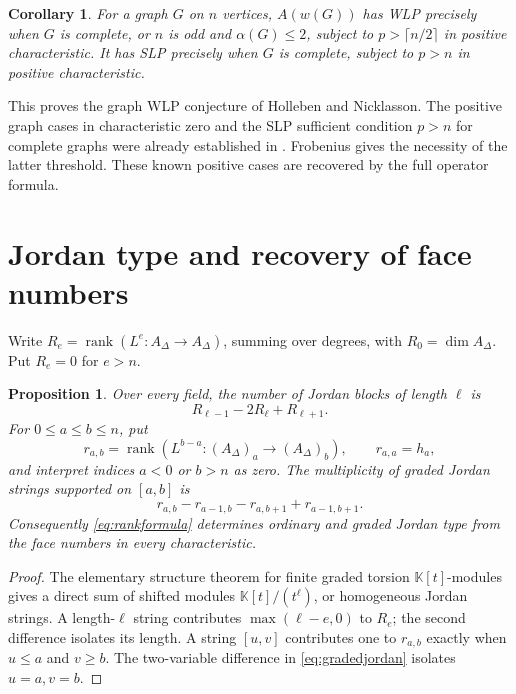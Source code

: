 \documentclass[11pt]{article}
\newtheorem{proposition}[theorem]{Proposition}
\newtheorem{corollary}[theorem]{Corollary}
\theoremstyle{remark}
\newcommand{\kk}{\mathbb K}
\newcommand{\rk}{\operatorname{rank}}
\begin{document}
\begin{corollary}\label{cor:graph}
For a graph $G$ on $n$ vertices, $A(w(G))$ has WLP precisely when $G$ is complete, or $n$ is odd and $\alpha(G)\leq2$, subject to $p>\lceil n/2\rceil$ in positive characteristic. It has SLP precisely when $G$ is complete, subject to $p>n$ in positive characteristic.
\end{corollary}
This proves the graph WLP conjecture of Holleben and Nicklasson. The positive graph cases in characteristic zero and the SLP sufficient condition $p>n$ for complete graphs were already established in \cite{HN}. Frobenius gives the necessity of the latter threshold. These known positive cases are recovered by the full operator formula.

\section{Jordan type and recovery of face numbers}
Write $R_e=\rk(L^e:A_\Delta\to A_\Delta)$, summing over degrees, with $R_0=\dim A_\Delta$. Put $R_e=0$ for $e>n$.
\begin{proposition}\label{prop:jordan}
Over every field, the number of Jordan blocks of length $\ell$ is
\[
 R_{\ell-1}-2R_\ell+R_{\ell+1}.
\]
For $0\leq a\leq b\leq n$, put
\[
 r_{a,b}=\rk(L^{b-a}:(A_\Delta)_a\to(A_\Delta)_b),
 \qquad r_{a,a}=h_a,
\]
and interpret indices $a<0$ or $b>n$ as zero. The multiplicity of graded Jordan strings supported on $[a,b]$ is
\begin{equation}\label{eq:gradedjordan}
 r_{a,b}-r_{a-1,b}-r_{a,b+1}+r_{a-1,b+1}.
\end{equation}
Consequently \eqref{eq:rankformula} determines ordinary and graded Jordan type from the face numbers in every characteristic.
\end{proposition}
\begin{proof}
The elementary structure theorem for finite graded torsion $\kk[t]$-modules gives a direct sum of shifted modules $\kk[t]/(t^\ell)$, or homogeneous Jordan strings. A length-$\ell$ string contributes $\max(\ell-e,0)$ to $R_e$; the second difference isolates its length. A string $[u,v]$ contributes one to $r_{a,b}$ exactly when $u\leq a$ and $v\geq b$. The two-variable difference in \eqref{eq:gradedjordan} isolates $u=a,v=b$.
\end{proof}
\end{document}
